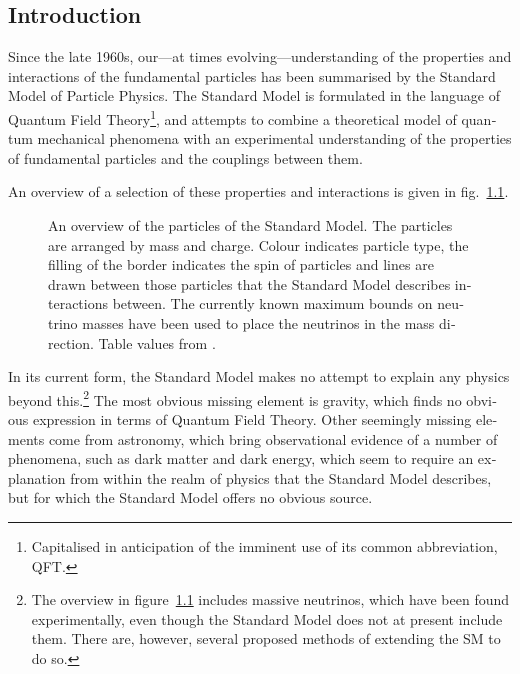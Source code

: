 \begin{english}

\tableofcontents
\mainmatter

\chapter{Introduction}

Since the late 1960s, our---at times evolving---understanding of the properties and interactions of the fundamental particles has been summarised by the Standard Model of Particle Physics. The Standard Model is formulated in the language of Quantum Field Theory\footnote{Capitalised in anticipation of the imminent use of its common abbreviation, QFT.}, and attempts to combine a theoretical model of quantum mechanical phenomena with an experimental understanding of the properties of fundamental particles and the couplings between them.

An overview of a selection of these properties and interactions is given in fig.~\ref{SMsum}.

\begin{figure}[htp]
\begin{minipage}[b]{.745\textwidth}

\end{minipage}
\hfill\begin{minipage}[b]{.25\textwidth}
\caption{An overview of the particles of the Standard Model. The particles are arranged by mass and charge. Colour indicates particle type, the filling of the border indicates the spin of particles and lines are drawn between those particles that the Standard Model describes interactions between. The currently known maximum bounds on neutrino masses have been used to place the neutrinos in the mass direction. Table values from \cite{wikism}.\label{SMsum}}
\end{minipage}
\end{figure}

In its current form, the Standard Model makes no attempt to explain any physics beyond this.\footnote{The overview in figure~\ref{SMsum} includes massive neutrinos, which have been found experimentally, even though the Standard Model does not at present include them. There are, however, several proposed methods of extending the SM to do so.} The most obvious missing element is gravity, which finds no obvious expression in terms of Quantum Field Theory. Other seemingly missing elements come from astronomy, which bring observational evidence of a number of phenomena, such as dark matter and dark energy, which seem to require an explanation from within the realm of physics that the Standard Model describes, but for which the Standard Model offers no obvious source.


\end{english}
